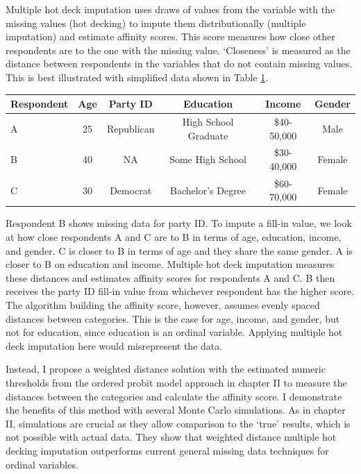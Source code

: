 \documentclass[12pt,econ]{sources/authesis}
\makeatletter
\def\caption{\refstepcounter\@captype \@dblarg{\@caption\@captype}}
\makeatother
\begin{document}
Multiple hot deck imputation uses draws of values from the variable with the missing values (hot decking) to impute them distributionally (multiple imputation) and estimate affinity scores. This score measures how close other respondents are to the one with the missing value. `Closeness' is measured as the distance between respondents in the variables that do not contain missing values. This is best illustrated with simplified data shown in Table \ref{ordmiss-affscore}.
\begin{table}[ht]
  \centering
  \begin{tabular}{lccccc}
  \bottomrule 
  \midrule
  Respondent & Age & Party ID & Education & Income & Gender\\
  \hline
  A & 25 & Republican & High School Graduate & \$40-50,000 & Male \\
  B & 40 & NA & Some High School &  \$30-40,000 & Female\\
  C & 30 & Democrat & Bachelor's Degree &  \$60-70,000 & Female\\
  \bottomrule 
  \end{tabular}
  \caption{Illustrative Data}
  \label{ordmiss-affscore}
\end{table}
Respondent B shows missing data for party ID. To impute a fill-in value, we look at how close respondents A and C are to B in terms of age, education, income, and gender. C is closer to B in terms of age and they share the same gender. A is closer to B on education and income. Multiple hot deck imputation measures these distances and estimates affinity scores for respondents A and C. B then receives the party ID fill-in value from whichever respondent has the higher score. The algorithm building the affinity score, however, assumes evenly spaced distances between categories. This is the case for age, income, and gender, but not for education, since education is an ordinal variable. Applying multiple hot deck imputation here would misrepresent the data.

Instead, I propose a weighted distance solution with the estimated numeric thresholds from the ordered probit model approach in chapter II to measure the distances between the categories and calculate the affinity score. I demonstrate the benefits of this method with several Monte Carlo simulations. As in chapter II, simulations are crucial as they allow comparison to the `true' results, which is not possible with actual data. They show that weighted distance multiple hot decking imputation outperforms current general missing data techniques for ordinal variables.
\end{document}
